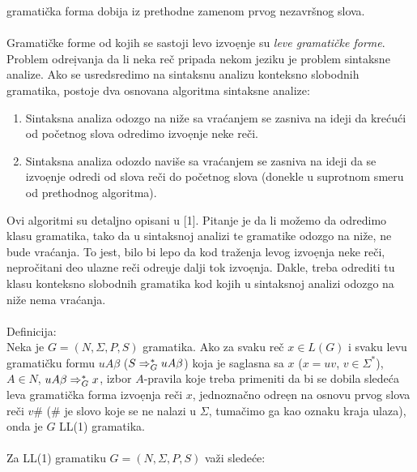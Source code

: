       gramati\v cka forma dobija iz prethodne zamenom prvog nezavr\v snog
      slova.\\
      \\
      Gramati\v cke forme od kojih se sastoji levo izvo\d enje su {\em leve
      gramati\v cke forme}.
%
%
      Problem odre\d ivanja da li neka re\v c pripada nekom jeziku je
      problem sintaksne analize.
      Ako se usredsredimo na sintaksnu analizu konteksno slobodnih gramatika,
      postoje dva osnovana algoritma sintaksne analize:
      \begin{enumerate}
        \item
        {
          Sintaksna analiza odozgo na ni\v ze sa vra\'canjem se zasniva na
          ideji da kre\'cu\'ci od po\v cetnog slova odredimo izvo\d enje
          neke re\v ci.
        }
        \item
        {
          Sintaksna analiza odozdo navi\v se sa vra\'canjem se zasniva na
          ideji da se izvo\d enje odredi od slova re\v ci do po\v cetnog
          slova (donekle u suprotnom smeru od prethodnog algoritma).
        }
      \end{enumerate}
      Ovi algoritmi su detaljno opisani u [1].
      Pitanje je da li mo\v zemo da odredimo klasu gramatika, tako da
      u sintaksnoj analizi te gramatike odozgo na ni\v ze, ne bude
      vra\'canja.
      To jest, bilo bi lepo da kod tra\v zenja levog izvo\d enja neke
      re\v ci, nepro\v citani deo ulazne re\v ci odre\d uje dalji
      tok izvo\d enja.
      Dakle, treba odrediti tu klasu konteksno slobodnih gramatika kod
      kojih u sintaksnoj analizi odozgo na ni\v ze nema vra\'canja.\\
      \\
      Definicija:\\
      Neka je $G=(N,\Sigma,P,S)$ gramatika.
      Ako za svaku re\v c $x\in L(G)$ i svaku levu gramati\v cku formu
      $uA\beta$ ($S\Rightarrow^{*}_{G}uA\beta$) koja je saglasna sa $x$
      ($x=uv$, $v\in\Sigma^{*}$), $A\in N$, $uA\beta\Rightarrow^{*}_{G}x$,
      izbor $A$-pravila koje treba primeniti da bi se dobila slede\'ca
      leva gramati\v cka forma izvo\d enja re\v ci $x$, jednozna\v cno
      odre\d en na osnovu prvog slova re\v ci $v\#$ ($\#$ je slovo
      koje se ne nalazi u $\Sigma$, tuma\v cimo ga kao oznaku kraja ulaza),
      onda je $G$ LL(1) gramatika.\\
      \\
      Za LL(1) gramatiku $G=(N,\Sigma,P,S)$ va\v zi slede\'ce:\\

